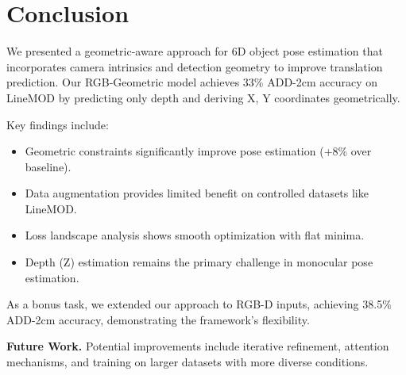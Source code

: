 \section{Conclusion}
\label{sec:conclusion}

We presented a geometric-aware approach for 6D object pose estimation that incorporates camera intrinsics and detection geometry to improve translation prediction. Our RGB-Geometric model achieves 33\% ADD-2cm accuracy on LineMOD by predicting only depth and deriving X, Y coordinates geometrically.

Key findings include:
\begin{itemize}
    \item Geometric constraints significantly improve pose estimation (+8\% over baseline).
    \item Data augmentation provides limited benefit on controlled datasets like LineMOD.
    \item Loss landscape analysis shows smooth optimization with flat minima.
    \item Depth (Z) estimation remains the primary challenge in monocular pose estimation.
\end{itemize}

As a bonus task, we extended our approach to RGB-D inputs, achieving 38.5\% ADD-2cm accuracy, demonstrating the framework's flexibility.

\textbf{Future Work.} Potential improvements include iterative refinement, attention mechanisms, and training on larger datasets with more diverse conditions.
